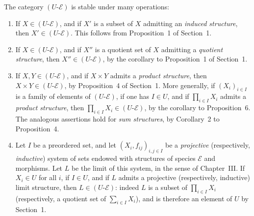 \documentclass[11pt]{article}
\begin{document}
The category \((U\text{-}\mathcal E)\) is stable under many operations:
\begin{enumerate}[label=\alph*)]
\item If \(X\in(U\text{-}\mathcal E)\), and if \(X'\) is a subset of \(X\) admitting an \emph{induced structure}, then \(X'\in(U\text{-}\mathcal E)\). This follows from Proposition~1 of Section~1.
\item If \(X\in(U\text{-}\mathcal E)\), and if \(X''\) is a quotient set of \(X\) admitting a \emph{quotient structure}, then \(X''\in(U\text{-}\mathcal E)\), by the corollary to Proposition~1 of Section~1.
\item If \(X,Y\in(U\text{-}\mathcal E)\), and if \(X\times Y\) admits a \emph{product structure}, then \(X\times Y\in(U\text{-}\mathcal E)\), by Proposition~4 of Section~1. More generally, if \((X_i)_{i\in I}\) is a family of elements of \((U\text{-}\mathcal E)\), if one has \(I\in U\), and if \(\prod_{i\in I}X_i\) admits a \emph{product structure}, then \(\prod_{i\in I}X_i\in(U\text{-}\mathcal E)\), by the corollary to Proposition~6. The analogous assertions hold for \emph{sum structures}, by Corollary~2 to Proposition~4.
\item Let \(I\) be a preordered set, and let \((X_i,f_{ij})_{i,j\in I}\) be a \emph{projective} (respectively, \emph{inductive}) system of sets endowed with structures of species \(\mathcal E\) and morphisms. Let \(L\) be the limit of this system, in the sense of Chapter~III. If \(X_i\in U\) for all \(i\), if \(I\in U\), and if \(L\) admits a projective (respectively, inductive) limit structure, then \(L\in(U\text{-}\mathcal E)\): indeed \(L\) is a subset of \(\prod_{i\in I}X_i\) (respectively, a quotient set of \(\sum_{i\in I}X_i\)), and is therefore an element of \(U\) by Section~1.
\end{enumerate}
\end{document}
